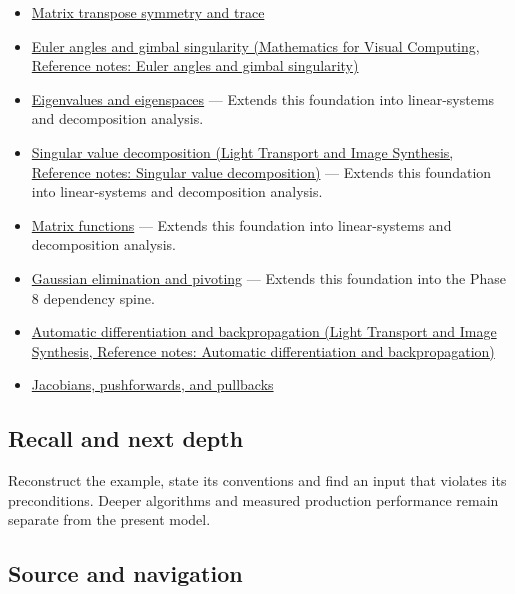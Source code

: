 \hypertarget{appendix-ab31ef447dbf-used-by}{}

\begin{itemize}
\item
  \hyperref[appendix-175ca5ff874d]{Matrix transpose symmetry and trace}
\item
  \href{../02-Mathematics-for-Visual-Computing/main.pdf\#nameddest=appendix-5f723fbd0593}{Euler angles and gimbal singularity (Mathematics for Visual Computing, Reference notes: Euler angles and gimbal singularity)}
\item
  \hyperref[appendix-0b3be18411f9]{Eigenvalues and eigenspaces} --- Extends this foundation into linear-systems and decomposition analysis.
\item
  \href{../04-Light-Transport-and-Image-Synthesis/main.pdf\#nameddest=appendix-1fad5e7f36fa}{Singular value decomposition (Light Transport and Image Synthesis, Reference notes: Singular value decomposition)} --- Extends this foundation into linear-systems and decomposition analysis.
\item
  \hyperref[appendix-0f4bc2bf2b1f]{Matrix functions} --- Extends this foundation into linear-systems and decomposition analysis.
\item
  \hyperref[appendix-f6e77f4a200f]{Gaussian elimination and pivoting} --- Extends this foundation into the Phase 8 dependency spine.
\item
  \href{../04-Light-Transport-and-Image-Synthesis/main.pdf\#nameddest=appendix-40df0855b4a7}{Automatic differentiation and backpropagation (Light Transport and Image Synthesis, Reference notes: Automatic differentiation and backpropagation)}
\item
  \hyperref[appendix-d8a7ddb675eb]{Jacobians, pushforwards, and pullbacks}
\end{itemize}

\subsection{Recall and next depth}\label{appendix-ab31ef447dbf-recall-and-next-depth}

\hypertarget{appendix-ab31ef447dbf-recall-and-next-depth}{}

Reconstruct the example, state its conventions and find an input that violates its preconditions. Deeper algorithms and measured production performance remain separate from the present model.

\subsection{Source and navigation}\label{appendix-ab31ef447dbf-source-and-navigation}

